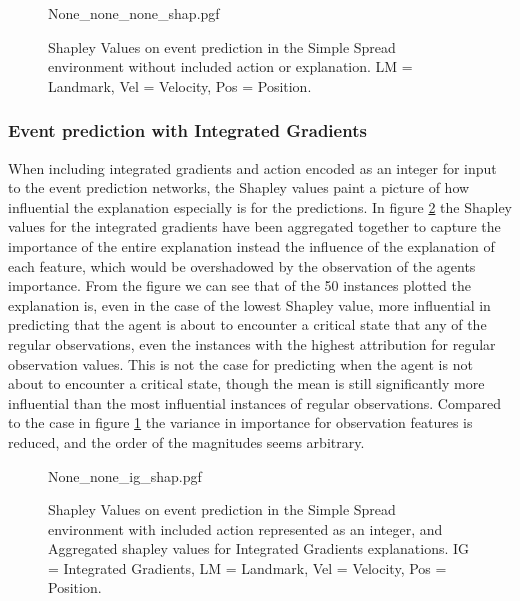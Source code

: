 \documentclass[UKenglish]{uiomasterthesis}
\begin{document}
\begin{center}
\begin{figure}[H]
\label{fig:event_simpl_shap}
{None_none_none_shap.pgf}
\caption{Shapley Values on event prediction in the Simple Spread environment without included action or explanation. LM = Landmark, Vel = Velocity, Pos = Position.}
\end{figure}
\end{center}

\subsubsection{Event prediction with Integrated Gradients}
When including integrated gradients and action encoded as an integer for input to the event prediction networks, the Shapley values paint a picture of how influential the explanation especially is for the predictions. In figure \ref{fig:event_simpl_ig_shap} the Shapley values for the integrated gradients have been aggregated together to capture the importance of the entire explanation instead the influence of the explanation of each feature, which would be overshadowed by the observation of the agents importance. From the figure we can see that of the 50 instances plotted the explanation is, even in the case of the lowest Shapley value, more influential in predicting that the agent is about to encounter a critical state that any of the regular observations, even the instances with the highest attribution for regular observation values. This is not the case for predicting when the agent is not about to encounter a critical state, though the mean is still significantly more influential than the most influential instances of regular observations. Compared to the case in figure \ref{fig:event_simpl_shap} the variance in importance for observation features is reduced, and the order of the magnitudes seems arbitrary.

\begin{center}
\begin{figure}[H]
\label{fig:event_simpl_ig_shap}
{None_none_ig_shap.pgf}
\caption{Shapley Values on event prediction in the Simple Spread environment with included action represented as an integer, and Aggregated shapley values for Integrated Gradients explanations. IG = Integrated Gradients, LM = Landmark, Vel = Velocity, Pos = Position.}
\end{figure}
\end{center}
\end{document}
